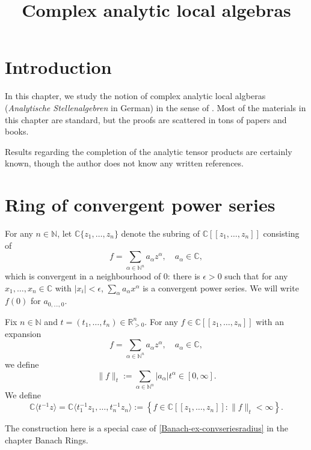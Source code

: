 






\title{Complex analytic local algebras}







%

\maketitle


\tableofcontents


\section{Introduction}

In this chapter, we study the notion of complex analytic local algberas (\emph{Analytische Stellenalgebren} in German) in the sense of \cite{GR71}. Most of the materials in this chapter are standard, but the proofs are scattered in tons of papers and books.

Results regarding the completion of the analytic tensor products are certainly known, though the author does not know any written references.
\section{Ring of convergent power series}

\begin{definition}\label{def-ringconvpowerseries}
    For any $n\in \mathbb{N}$, let $\mathbb{C}\{ z_1,\ldots,z_n\}$ denote the subring of $\mathbb{C}[[z_1,\ldots,z_n]]$ consisting of
    \[
        f=\sum_{\alpha\in \mathbb{N}^n} a_{\alpha}z^{\alpha},\quad a_{\alpha}\in \mathbb{C},
    \]
    which is  convergent in a neighbourhood of $0$: there is $\epsilon>0$ such that for any $x_1,\ldots,x_n\in \mathbb{C}$ with $|x_i|<\epsilon$, $\sum_{\alpha}a_{\alpha} x^{\alpha}$ is a convergent power series. We will write $f(0)$ for $a_{0,\ldots,0}$.
\end{definition}

\begin{definition}
    Fix $n\in \mathbb{N}$ and $t=(t_1,\ldots,t_n)\in \mathbb{R}_{> 0}^n$. For any $f\in \mathbb{C}[[z_1,\ldots,z_n]]$ with an expansion
    \[
        f=\sum_{\alpha\in \mathbb{N}^n} a_{\alpha}z^{\alpha},\quad a_{\alpha}\in \mathbb{C},  
    \]
    we define
    \[
        \|f\|_t:=\sum_{\alpha\in \mathbb{N}^n} |a_{\alpha}| t^{\alpha}\in [0,\infty].
    \]
    We define
    \[
        \mathbb{C}\langle t^{-1}z\rangle =\mathbb{C}\langle t_1^{-1}z_1,\ldots,t_n^{-1}z_n \rangle:=\left\{f\in \mathbb{C}[[z_1,\ldots,z_n]]: \|f\|_t<\infty \right\}.
    \]
\end{definition}
The construction here is a special case of \cref{Banach-ex-convseriesradius} in the chapter Banach Rings.

